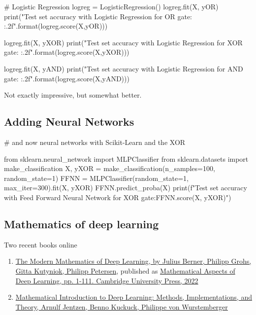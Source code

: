 \documentclass[%
oneside,                 %
final,                   %
10pt]{article}
\begin{document}
# Logistic Regression
logreg = LogisticRegression()
logreg.fit(X, yOR)
print("Test set accuracy with Logistic Regression for OR gate: {:.2f}".format(logreg.score(X,yOR)))

logreg.fit(X, yXOR)
print("Test set accuracy with Logistic Regression for XOR gate: {:.2f}".format(logreg.score(X,yXOR)))


logreg.fit(X, yAND)
print("Test set accuracy with Logistic Regression for AND gate: {:.2f}".format(logreg.score(X,yAND)))

\epycod


Not exactly impressive, but somewhat better.

\subsection{Adding Neural Networks}












\bpycod

# and now neural networks with Scikit-Learn and the XOR

from sklearn.neural_network import MLPClassifier
from sklearn.datasets import make_classification
X, yXOR = make_classification(n_samples=100, random_state=1)
FFNN = MLPClassifier(random_state=1, max_iter=300).fit(X, yXOR)
FFNN.predict_proba(X)
print(f"Test set accuracy with Feed Forward Neural Network  for XOR gate:{FFNN.score(X, yXOR)}")


\epycod


\subsection{Mathematics of deep learning}

\begin{block}{Two recent books online }
\begin{enumerate}
\item \href{{https://arxiv.org/abs/2105.04026}}{The Modern Mathematics of Deep Learning, by Julius Berner, Philipp Grohs, Gitta Kutyniok, Philipp Petersen}, published as \href{{https://doi.org/10.1017/9781009025096.002}}{Mathematical Aspects of Deep Learning, pp. 1-111. Cambridge University Press, 2022}

\item \href{{https://doi.org/10.48550/arXiv.2310.20360}}{Mathematical Introduction to Deep Learning: Methods, Implementations, and Theory, Arnulf Jentzen, Benno Kuckuck, Philippe von Wurstemberger}
\end{enumerate}

\noindent
\end{block}
\end{document}

